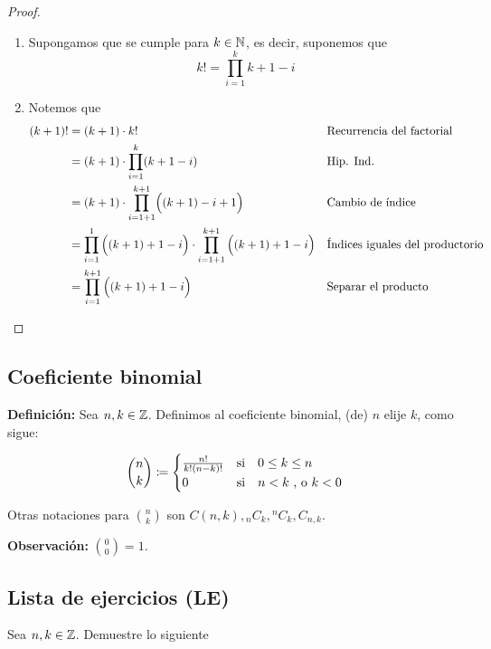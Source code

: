 \begin{enumerate}[label=\alph*)]
\begin{proof}
\begin{enumerate}[label=\Roman*)]
\begin{enumerate}[label=\roman*)]
        \item Supongamos que se cumple para $k\in \mathbb{N}$, es decir, suponemos que \[k! = \prod_{i=1}^k k+1-i\]
        \item Notemos que
        \begin{align*}
          (k+1)! &= (k+1) \cdot k! && \text{Recurrencia del factorial}\\
          &= (k+1) \cdot \prod_{i=1}^k (k+1-i) && \text{Hip. Ind.}\\
          &= (k+1)\cdot \prod_{i=1+1}^{k+1} \Bigl((k+1)-i+1\Bigr) && \text{Cambio de índice}\\
          &= \prod_{i=1}^1 \Big((k+1)+1-i\Big) \cdot \prod_{i=1+1}^{k+1} \Big((k+1)+1-i\Big) && \text{Índices iguales del productorio}\\
          &= \prod_{i=1}^{k+1} \Big((k+1)+1-i\Big) && \text{Separar el producto}\\
        \end{align*}
      \end{enumerate}
    \end{enumerate}
  \end{proof}
\end{enumerate}

\subsection*{Coeficiente binomial}

\textbf{Definición:} Sea $n,k\in \mathbb{Z}$. Definimos al coeficiente binomial, (de) $n$ elije $k$, como sigue:

\[ \binom{n}{k}\coloneqq
  \begin{cases}
  \frac{n!}{k!(n-k)!} &\text{si} \quad 0\leq k\leq n\\
  0 &\text{si} \quad n<k \ \text{, o} \ k<0
  \end{cases}
  \]

Otras notaciones para $\binom{n}{k}$ son $C(n, k), {}_nC_k, {}^nC_k, C_{n,k}$.

\textbf{Observación:} $\binom{0}{0} = 1$.

\clearpage
\pagebreak

\subsection*{Lista de ejercicios (LE)}

Sea $n,k\in \mathbb{Z}$. Demuestre lo siguiente

